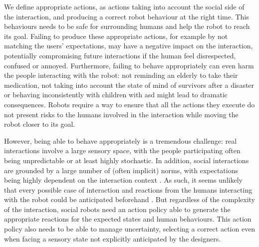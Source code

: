     We define appropriate actions, as actions taking into account the social side of the interaction, and producing a correct robot behaviour at the right time. This behaviours needs to be safe for surrounding humans and help the robot to reach its goal. Failing to produce these appropriate actions, for example by not matching the users' expectations, may have a negative impact on the interaction, potentially compromising future interactions if the human feel disrespected, confused or annoyed. Furthermore, failing to behave appropriately can even harm the people interacting with the robot: not reminding an elderly to take their medication, not taking into account the state of mind of survivors after a disaster or behaving inconsistently with children with \gls{asd} might lead to dramatic consequences. Robots require a way to ensure that all the actions they execute do not present risks to the humans involved in the interaction while moving the robot closer to its goal.
	
    
    However, being able to behave appropriately is a tremendous challenge: real interactions involve a large sensory space, with the people participating often being unpredictable or at least highly stochastic. In addition, social interactions are grounded by a large number of (often implicit) norms, with expectations being highly dependent on the interaction context \citep{sherif1936psychology}. As such, it seems unlikely that every possible case of interaction and reactions from the humans interacting with the robot could be anticipated beforehand \citep{dautenhahn2004robots}. But regardless of the complexity of the interaction, social robots need an action policy able to generate the appropriate reactions for the expected states and human behaviours. This action policy also needs to be able to manage uncertainty, selecting a correct action even when facing a sensory state not explicitly anticipated by the designers.
    
